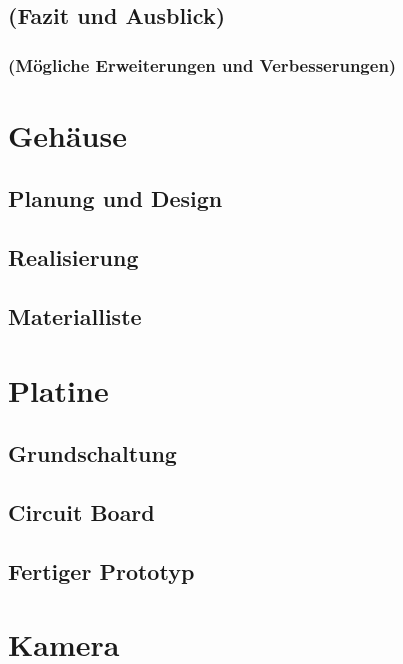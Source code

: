 \documentclass[ngerman,12pt,a4paper]{article}
\begin{document}
		\subsection{(Fazit und Ausblick)}
		
			\subsubsection{(Mögliche Erweiterungen und Verbesserungen)}
	
	\section{Gehäuse}
	
		\subsection{Planung und Design} %
		
		\subsection{Realisierung} %
	
		\subsection{Materialliste} %
	
	\section{Platine}
	
		\subsection{Grundschaltung} %
		
		\subsection{Circuit Board} %
		
		\subsection{Fertiger Prototyp} %
	
	
	\section{Kamera}
	
\end{document}

